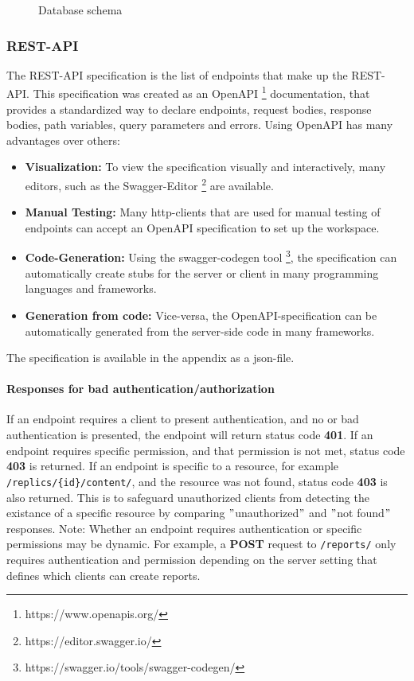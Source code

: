 \begin{figure}
    \centering
    \caption{Database schema}
    \label{fig:database-schema}
\end{figure}

\subsubsection{REST-API}
The REST-API specification is the list of endpoints that make up the REST-API\@.
This specification was created as an OpenAPI \footnote{https://www.openapis.org/} documentation, that provides a standardized way to declare endpoints, request bodies, response bodies, path variables, query parameters and errors.
Using OpenAPI has many advantages over others:
\begin{itemize}
    \item \textbf{Visualization:} To view the specification visually and interactively, many editors, such as the Swagger-Editor \footnote{https://editor.swagger.io/} are available.
    \item \textbf{Manual Testing:} Many http-clients that are used for manual testing of endpoints can accept an OpenAPI specification to set up the workspace.
    \item \textbf{Code-Generation:} Using the swagger-codegen tool \footnote{https://swagger.io/tools/swagger-codegen/}, the specification can automatically create stubs for the server or client in many programming languages and frameworks.
    \item \textbf{Generation from code:} Vice-versa, the OpenAPI-specification can be automatically generated from the server-side code in many frameworks.
\end{itemize}

The specification is available in the appendix as a json-file. \newline

\paragraph{Responses for bad authentication/authorization}
If an endpoint requires a client to present authentication, and no or bad authentication is presented, the endpoint will return status code \textbf{401}. \newline
If an endpoint requires specific permission, and that permission is not met, status code \textbf{403} is returned.
If an endpoint is specific to a resource, for example \texttt{/replics/\{id\}/content/}, and the resource was not found, status code \textbf{403} is also returned.
This is to safeguard unauthorized clients from detecting the existance of a specific resource by comparing \("\)unauthorized\("\) and \("\)not found\("\) responses. \newline
Note: Whether an endpoint requires authentication or specific permissions may be dynamic.
For example, a \textbf{POST} request to \texttt{/reports/} only requires authentication and permission depending on the server setting that defines which clients can create reports.

